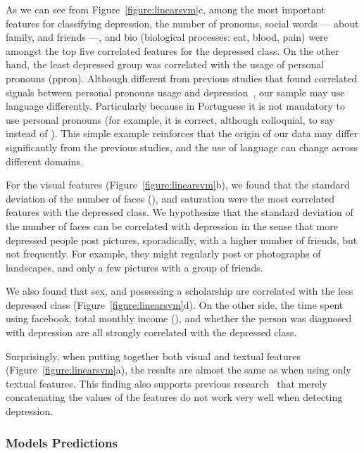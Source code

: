 \documentclass[letterpaper]{article} \usepackage{aaai20}  \usepackage{times}  \usepackage{helvet} \usepackage{courier}  \usepackage[hyphens]{url}  \usepackage{graphicx} \urlstyle{rm} \def\UrlFont{\rm}  \usepackage{graphicx}  \frenchspacing  \setlength{\pdfpagewidth}{8.5in}  \setlength{\pdfpageheight}{11in}  \usepackage[final]{changes}
\begin{document}
As we can see from Figure~\ref{figure:linearsvm}c, among the most important features for classifying depression, the number of pronouns, social words --- about family, and friends ---, and bio (biological processes: eat, blood, pain) were amongst the top five correlated features for the depressed class. On the other hand, the least depressed group was correlated with the usage of personal pronouns (ppron). Although different from previous studies that found correlated signals between personal pronouns usage and depression~\cite{rude2004language,morales2018linguistically,de2013predicting}, our sample may use language differently. Particularly because in Portuguese it is not mandatory to use personal pronouns (for example, it is correct, although colloquial, to say {\textsl{}} instead of {\textsl{}}). This simple example reinforces that the origin of our data may differ significantly from the previous studies, and the use of language can change across different domains.

For the visual features (Figure~\ref{figure:linearsvm}b), we found that the standard deviation of the number of faces (), and saturation were the most correlated features with the depressed class. We hypothesize that the standard deviation of the number of faces can be correlated with depression in the sense that more depressed people post pictures, sporadically, with a higher number of friends, but not frequently. For example, they might regularly post  or photographs of landscapes, and only a few pictures with a group of friends.

We also found that sex, and possessing a scholarship are correlated with the less depressed class (Figure~\ref{figure:linearsvm}d). On the other side, the time spent using facebook, total monthly income (), and whether the person was diagnosed with depression are all strongly correlated with the depressed class.

Surprisingly, when putting together both visual and textual features (Figure~\ref{figure:linearsvm}a), the results are almost the same as when using only textual features. This finding also supports previous research~\cite{morales2018linguistically,shen2017depression} that merely concatenating the values of the features do not work very well when detecting depression.

\subsubsection{Models Predictions}
\end{document}
